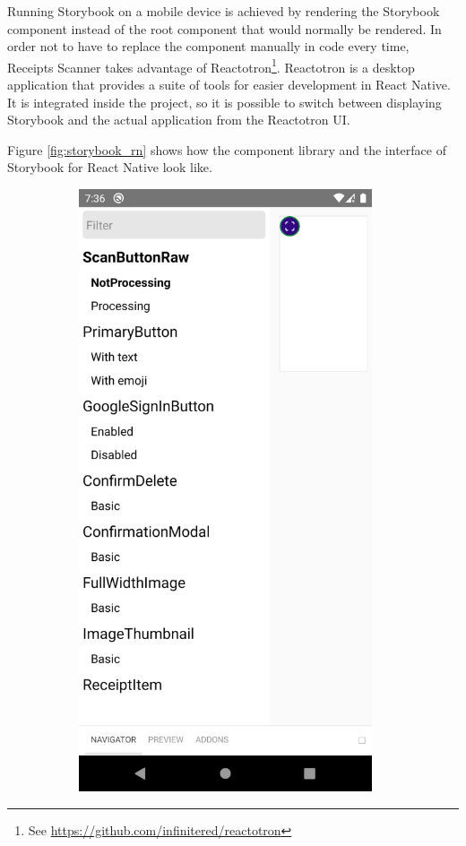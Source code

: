 \documentclass[
  digital, %
  table,   %
  oneside, %
  lof,     %
  lot,     %
]{fithesis3}
\begin{document}
Running Storybook on a mobile device is achieved by rendering the Storybook component instead of the root component that would normally be rendered. In order not to have to replace the component manually in code every time, Receipts Scanner takes advantage of Reactotron\footnote{See \url{https://github.com/infinitered/reactotron}}. Reactotron is a desktop application that provides a suite of tools for easier development in React Native. It is integrated inside the project, so it is possible to switch between displaying Storybook and the actual application from the Reactotron UI. 

Figure \ref{fig:storybook_rn} shows how the component library and the interface of Storybook for React Native look like.

\begin{figure}
    \centering
    \begin{subfigure}[t]{0.5\textwidth}
      \centering
      \includegraphics[width=0.95\textwidth]{figures/other/storybook_rn_menu}

\end{subfigure}
\end{figure}
\end{document}
